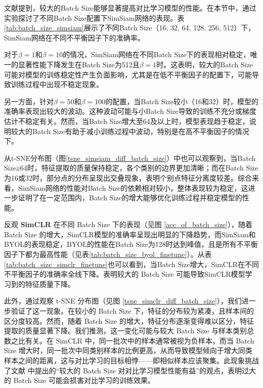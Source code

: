 \documentclass[master]{thesis-uestc}
\begin{document}
文献\cite{chen2020simple}提到，较大的Batch Size能够显著提高对比学习模型的性能。在本节中，通过实验探讨了不同Batch Size配置下SimSiam网络的表现。表\ref{tab:batch_size_simsiam}展示了不同Batch Size（16, 32, 64, 128, 256, 512）下，SimSiam网络在不同不平衡因子下的准确率。

对于$\beta=1$和$\beta=10$的情况，SimSiam网络在不同Batch Size下的表现相对稳定，唯一的显著性能下降发生在Batch Size为512且$\beta=1$时。这表明，较大的Batch Size可能对模型的训练稳定性产生负面影响，尤其是在低不平衡因子的配置下，可能导致训练过程中出现不稳定现象。

另一方面，针对$\beta=50$和$\beta=100$的配置，当Batch Size较小（16和32）时，模型的准确率表现出较大的波动。这种波动可能与小Batch Size导致的训练不充分或梯度估计不稳定有关。然而，当Batch Size增大至64及以上时，模型表现趋于稳定，说明较大的Batch Size有助于减小训练过程中波动，特别是在高不平衡因子的情况下。

从t-SNE分布图（图\ref{tsne_simsiam_diff_batch_size}）中也可以观察到，当Batch Size≥64时，特征提取的质量保持稳定，各个类别的边界更加清晰；而在Batch Size为16或32时，部分点的分布呈现出交叠现象，表明个别点特征分离度较差。综合来看，SimSiam网络的性能对Batch Size的依赖相对较小，整体表现较为稳定，这进一步证明了在一定范围内，Batch Size的增大能够优化训练过程并稳定模型的性能。

反观 \textbf{SimCLR} 在不同 Batch Size 下的表现（见图 \ref{acc_of_batch_size}），随着 Batch Size 的增大，SimCLR模型的准确率呈现出明显的下降趋势，而SimSiam和BYOL的表现稳定，BYOL的性能在Batch Size为128时达到峰值，且是所有不平衡因子下都为最高性能（见表\ref{tab:batch_size_byol_finetune}）。从表\ref{tab:batch_size_simclr_finetune}也可以看到，当Batch Size增大，SimCLR在不同不平衡因子的准确率全线下降。表明较大的 Batch Size 可能导致SimCLR模型学习到的特征质量下降。

此外，通过观察 t-SNE 分布图（见图 \ref{tsne_simclr_diff_batch_size}），我们进一步验证了这一现象。在较小的 Batch Size 下，特征的分布较为紧凑，且样本间的区分度较高。然而，随着 Batch Size 的增大，特征分布逐渐变得难以区分，特征提取的质量显著下降。我们推测，这一变化可能与较大 Batch Size 与样本类别总数之比有关。在 SimCLR 中，同一批次中的样本通常被视为负样本，而当 Batch Size 增大时，同一批次中同类别样本的比例更高，从而导致模型倾向于增大同类样本之间的距离，这与对比学习的目标相悖——即相似样本应该聚集。此现象挑战了文献 \cite{chen2020simple} 中提出的“较大的 Batch Size 对对比学习模型性能有益”的观点，表明过大的 Batch Size 可能会损害对比学习的训练效果。
\end{document}
